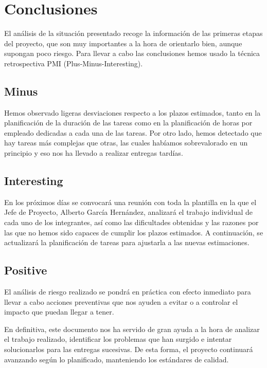 \section{Conclusiones}
\par El análisis de la situación presentado recoge la información de las primeras etapas del proyecto, que son muy importantes a la hora de orientarlo bien, aunque supongan poco riesgo. Para llevar a cabo las conclusiones hemos usado la técnica retrospectiva PMI (Plus-Minus-Interesting).
\subsection{Minus}
\par Hemos observado ligeras desviaciones respecto a los plazos estimados, tanto en la planificación de la duración de las tareas como en la planificación de horas por empleado dedicadas a cada una de las tareas. Por otro lado, hemos detectado que hay tareas más complejas que otras, las cuales habíamos sobrevalorado en un principio y eso nos ha llevado a realizar entregas tardías.
\subsection{Interesting}
\par En los próximos días se convocará una reunión con toda la plantilla en la que el Jefe de Proyecto, Alberto García Hernández, analizará el trabajo individual de cada uno de los integrantes, así como las dificultades obtenidas y las razones por las que no hemos sido capaces de cumplir los plazos estimados. A continuación, se actualizará la planificación de tareas para ajustarla a las nuevas estimaciones.
\subsection{Positive}
\par El análisis de riesgo realizado se pondrá en práctica con efecto inmediato para llevar a cabo acciones preventivas que nos ayuden a evitar o a controlar el impacto que puedan llegar a tener.
\bigbreak
\par En definitiva, este documento nos ha servido de gran ayuda a la hora de analizar el trabajo realizado, identificar los problemas que han surgido e intentar solucionarlos para las entregas sucesivas. De esta forma, el proyecto continuará avanzando según lo planificado, manteniendo los estándares de calidad.
